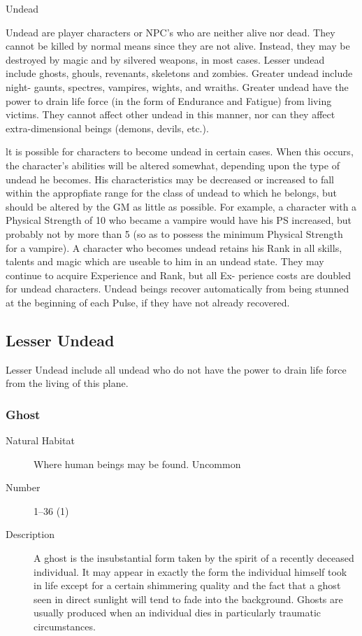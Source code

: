 \begin{mmgroup}{Undead}

Undead are player characters or NPC's who are neither alive nor
dead. They cannot be killed by normal means since they are not
alive. Instead, they may be destroyed by magic and by silvered
weapons, in most cases.  Lesser undead include ghosts, ghouls,
revenants, skeletons and zombies.  Greater undead include night-
gaunts, spectres, vampires, wights, and wraiths.  Greater undead have
the power to drain life force (in the form of Endurance and Fatigue)
from living victims.  They cannot affect other undead in this manner,
nor can they affect extra-dimensional beings (demons, devils, etc.).

lt is possible for characters to become undead in certain cases.  When
this occurs, the character's abilities will be altered somewhat,
depending upon the type of undead he becomes.  His characteristics may
be decreased or increased to fall within the appropfiate range for the
class of undead to which he belongs, but should be altered by the GM
as little as possible.  For example, a character with a Physical
Strength of 10 who became a vampire would have his PS increased, but
probably not by more than 5 (so as to possess the minimum Physical
Strength for a vampire).  A character who becomes undead retains his
Rank in all skills, talents and magic which are useable to him in an
undead state.  They may continue to acquire Experience and Rank, but
all Ex- perience costs are doubled for undead characters.  Undead
beings recover automatically from being stunned at the beginning of
each Pulse, if they have not already recovered.

\subsection{Lesser Undead}
Lesser Undead include all undead who do not have the power to drain
life force from the living of this plane.

\subsubsection{Ghost}

\begin{description}
\item[Natural Habitat] Where human beings may be found. Uncommon

\item[Number] 1–36 (1)

\item[Description] A ghost is the insubstantial form taken by the spirit of
a recently deceased individual. It may appear in exactly the form the
individual himself took in life except for a certain shimmering
quality and the fact that a ghost seen in direct sunlight will tend to
fade into the background. Ghosts are usually produced when an
individual dies in particularly traumatic circumstances.


\end{description}
\end{mmgroup}
